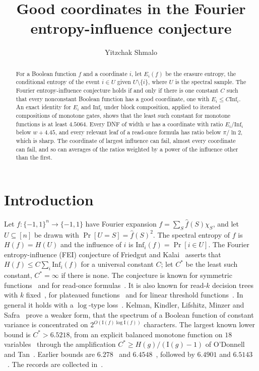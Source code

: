 \documentclass[11pt]{amsart}
\title{Good coordinates in the Fourier entropy-influence conjecture}
\author{Yitzchak Shmalo}
\date{}
\theoremstyle{definition}
\theoremstyle{remark}
\newcommand{\Inf}{\mathrm{Inf}}
\begin{document}
\begin{abstract}
For a Boolean function $f$ and a coordinate $i$, let $E_i(f)$ be the erasure entropy, the conditional entropy of the
event $i\in U$ given $U\setminus\{i\}$, where $U$ is the spectral sample. The Fourier entropy-influence conjecture
holds if and only if there is one constant $C$ such that every nonconstant Boolean function has a good coordinate, one
with $E_i\le C\Inf_i$. An exact identity for $E_i$ and $\Inf_i$ under block composition, applied to iterated
compositions of monotone gates, shows that the least such constant for monotone functions is at least $4.5064$.
Every DNF of width $w$ has a coordinate with ratio $E_i/\Inf_i$ below $w+4.45$, and every relevant leaf of a read-once
formula has ratio below $\pi/\ln2$, which is sharp. The coordinate of largest influence can fail, almost every
coordinate can fail, and so can averages of the ratios weighted by a power of the influence other than the first.
\end{abstract}


\maketitle

\section{Introduction}\label{sec:intro}

Let $f:\{-1,1\}^n\to\{-1,1\}$ have Fourier expansion $f=\sum_S\hat f(S)\chi_S$, and let $U\subseteq[n]$ be drawn with
$\Pr[U=S]=\hat f(S)^2$. The spectral entropy of $f$ is $H(f)=H(U)$ and the influence of $i$ is
$\Inf_i(f)=\Pr[i\in U]$. The Fourier entropy-influence (FEI) conjecture of Friedgut and Kalai~\cite{FK} asserts
that $H(f)\le C\sum_i\Inf_i(f)$ for a universal constant $C$; let $C^\ast$ be the least such constant, $C^\ast=\infty$
if there is none. The conjecture is known for symmetric functions~\cite{OWZ} and for read-once formulas~\cite{OT13,CKLS}. It is
also known for read-$k$ decision trees with $k$ fixed~\cite{WWW14}, for plateaued functions~\cite{Pot26} and for
linear threshold functions~\cite{ShmLTF}. In general it holds with a $\log$-type loss~\cite{Han,KMS}. Kelman,
Kindler, Lifshitz, Minzer and Safra~\cite{KKLMS} prove a weaker form, that the spectrum of a Boolean function of constant variance is concentrated on $2^{O(\mathrm I(f)\log\mathrm
I(f))}$ characters. The largest known lower bound is $C^\ast>6.5218$, from an explicit balanced monotone function on $18$ variables~\cite{Num26} through the amplification $C^\ast\ge H(g)/(\mathrm I(g)-1)$ of O'Donnell and Tan~\cite{OT13}. Earlier bounds are $6.278$~\cite{OT13} and $6.4548$~\cite{Hod}, followed by
$6.4901$ and $6.5143$~\cite{MI26a,MI26b}. The records are collected in~\cite{TaoC}.
\end{document}
